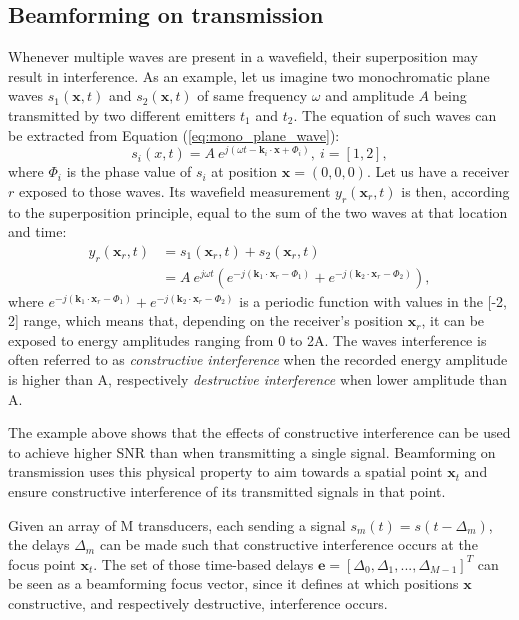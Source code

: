 \subsection{Beamforming on transmission}
\label{sec:beamforming_transmission}
Whenever multiple waves are present in a wavefield, their superposition may result in interference.
As an example, let us imagine two monochromatic plane waves $s_1(\boldsymbol{x}, t)$ and $s_2(\boldsymbol{x}, t)$ of same frequency $\omega$ and amplitude $A$ being transmitted by two different emitters $t_1$ and $t_2$. The equation of such waves can be extracted from Equation (\ref{eq:mono_plane_wave}):
\begin{equation}
    s_i(x, t) = A ~ e^{j (\omega t - \boldsymbol{k}_i \cdot \boldsymbol{x} + \Phi_i)}, ~ i = [1, 2],
\end{equation}
\noindent
where $\Phi_i$ is the phase value of $s_i$ at position $\boldsymbol{x} = (0, 0, 0)$.
Let us have a receiver $r$ exposed to those waves. Its wavefield measurement $y_r(\boldsymbol{x}_r, t)$ is then, according to the superposition principle, equal to the sum of the two waves at that location and time:
\begin{align}
    y_r(\boldsymbol{x}_r, t) &= s_1(\boldsymbol{x}_r, t) + s_2(\boldsymbol{x}_r, t) \nonumber \\
    &= A ~ e^{j \omega t} (e^{-j (\boldsymbol{k}_1 \cdot \boldsymbol{x}_r - \Phi_1)} + e^{-j (\boldsymbol{k}_2 \cdot \boldsymbol{x}_r - \Phi_2)}),
\end{align}
\noindent
where $e^{-j (\boldsymbol{k}_1 \cdot \boldsymbol{x}_r - \Phi_1)} + e^{-j (\boldsymbol{k}_2 \cdot \boldsymbol{x}_r - \Phi_2)}$ is a periodic function with values in the [-2, 2] range, which means that, depending on the receiver's position $\boldsymbol{x}_r$, it can be exposed to energy amplitudes ranging from 0 to 2A. The waves interference is often referred to as \textit{constructive interference} when the recorded energy amplitude is higher than A, respectively \textit{destructive interference} when lower amplitude than A.

The example above shows that the effects of constructive interference can be used to achieve higher SNR than when transmitting a single signal.
Beamforming on transmission uses this physical property to aim towards a spatial point $\boldsymbol{x}_t$ and ensure constructive interference of its transmitted signals in that point.

Given an array of M transducers, each sending a signal $s_m(t) = s(t - \Delta_m)$, the delays $\Delta_m$ can be made such that constructive interference occurs at the focus point $\boldsymbol{x}_t$. The set of those time-based delays $\boldsymbol{e} = [\Delta_0, \Delta_1, ..., \Delta_{M-1}]^T$ can be seen as a beamforming focus vector, since it defines at which positions $\boldsymbol{x}$ constructive, and respectively destructive, interference occurs.


